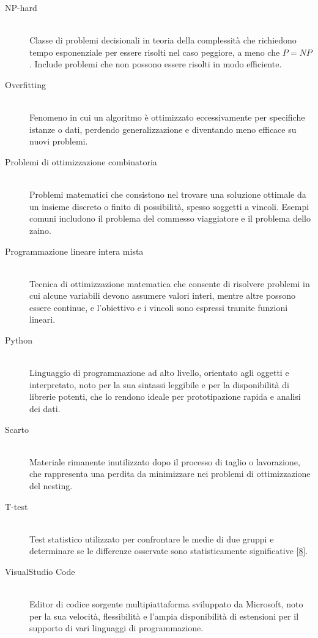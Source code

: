 \begin{description}
    \item[NP-hard] \hfill \\
    Classe di problemi decisionali in teoria della complessità che richiedono tempo esponenziale per essere risolti nel caso peggiore, a meno che $P=NP$. Include problemi che non possono essere risolti in modo efficiente.

    \item[Overfitting] \hfill \\
    Fenomeno in cui un algoritmo è ottimizzato eccessivamente per specifiche istanze o dati, perdendo generalizzazione e diventando meno efficace su nuovi problemi.

    \item[Problemi di ottimizzazione combinatoria] \hfill \\
    Problemi matematici che consistono nel trovare una soluzione ottimale da un insieme discreto o finito di possibilità, spesso soggetti a vincoli. Esempi comuni includono il problema del commesso viaggiatore e il problema dello zaino.

    \item[Programmazione lineare intera mista] \hfill \\
    Tecnica di ottimizzazione matematica che consente di risolvere problemi in cui alcune variabili devono assumere valori interi, mentre altre possono essere continue, e l'obiettivo e i vincoli sono espressi tramite funzioni lineari.

    \item[Python] \hfill \\
    Linguaggio di programmazione ad alto livello, orientato agli oggetti e interpretato, noto per la sua sintassi leggibile e per la disponibilità di librerie potenti, che lo rendono ideale per prototipazione rapida e analisi dei dati.

    \item[Scarto] \hfill \\
    Materiale rimanente inutilizzato dopo il processo di taglio o lavorazione, che rappresenta una perdita da minimizzare nei problemi di ottimizzazione del nesting.

    \item[T-test] \hfill \\ \hypertarget{gls4}{}
    Test statistico utilizzato per confrontare le medie di due gruppi e determinare se le differenze osservate sono statisticamente significative [\hyperlink{bibliografia}{8}].

    \item[VisualStudio Code] \hfill \\
    Editor di codice sorgente multipiattaforma sviluppato da Microsoft, noto per la sua velocità, flessibilità e l'ampia disponibilità di estensioni per il supporto di vari linguaggi di programmazione.
\end{description}

